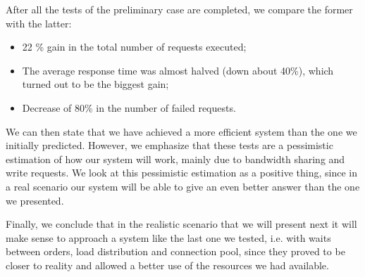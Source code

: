   After all the tests of the preliminary case are completed, we compare the former with the latter:
  
  \begin{itemize}
      \item 22 \% gain in the total number of requests executed;
      \item The average response time was almost halved (down about 40\%), which turned out to be the biggest gain;
      \item Decrease of 80\% in the number of failed requests.
  \end{itemize}
  
  We can then state that we have achieved a more efficient system than the one we initially predicted. However, we emphasize that these tests are a pessimistic estimation of how our system will work, mainly due to bandwidth sharing and write requests. We look at this pessimistic estimation as a positive thing, since in a real scenario our system will be able to give an even better answer than the one we presented.
  
  Finally, we conclude that in the realistic scenario that we will present next it will make sense to approach a system like the last one we tested, i.e. with waits between orders, load distribution and connection pool, since they proved to be closer to reality and allowed a better use of the resources we had available.
